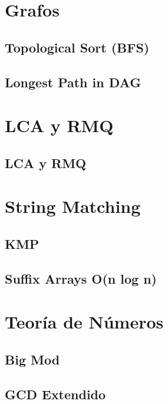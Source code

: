 \documentclass[10pt,letterpaper,twocolumn,twosided]{article}
\newcommand{\codigofuente}[1]{

\dotfill
}
\begin{document}
\section{Grafos}
\subsection{Topological Sort (BFS)}
\codigofuente{./graphs/topological_sort.cpp}

\subsection{Longest Path in DAG}
\codigofuente{./graphs/longest_path_in_dag.cpp}

\section {LCA y RMQ}
\subsection{LCA y RMQ}
\codigofuente{./lca/lca.cpp}

\section{String Matching}
\subsection{KMP}
\codigofuente{./string_matching/kmp.cpp}
\subsection{Suffix Arrays O(n log n)}
\codigofuente{./string_matching/suffix_arrays.cpp}
\medskip

\section{Teoría de Números}
\subsection{Big Mod}
\codigofuente{./teoria_numeros/bigMod.cpp}

\subsection{GCD Extendido}
\codigofuente{./teoria_numeros/extended_gcd.cpp}
\end{document}

